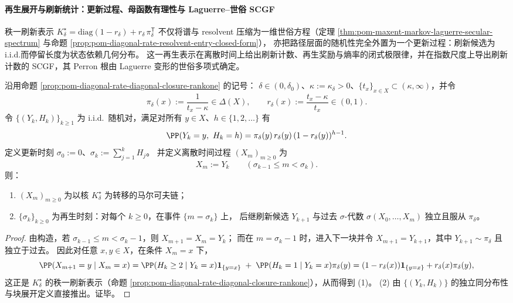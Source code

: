\paragraph{再生展开与刷新统计：更新过程、母函数有理性与 Laguerre--世俗 SCGF}
秩一刷新表示
\(
K^\star_\delta=\mathrm{diag}(1-r_\delta)+r_\delta\,\pi_\delta^{\mathsf T}
\)
不仅将谱与 resolvent 压缩为一维世俗方程（定理 \ref{thm:pom-maxent-markov-laguerre-secular-spectrum} 与命题 \ref{prop:pom-diagonal-rate-resolvent-entry-closed-form}），
亦把路径层面的随机性完全外置为一个更新过程：刷新候选为 i.i.d.\，而停留长度为状态依赖几何分布。
这一再生表示在离散时间上给出刷新计数、再生奖励与熵率的闭式极限律，并在指数尺度上导出刷新计数的 SCGF，其 Perron 根由 Laguerre 变形的世俗多项式确定。

\begin{theorem}[秩一刷新核的再生展开表示]\label{thm:pom-diagonal-rate-refresh-regeneration-iid-expansion}
沿用命题 \ref{prop:pom-diagonal-rate-diagonal-closure-rankone} 的记号：
\(\delta\in(0,\delta_0)\)、\(\kappa:=\kappa_\delta>0\)、\(\{t_x\}_{x\in X}\subset(\kappa,\infty)\)，并令
\[
\pi_\delta(x):=\frac{1}{t_x-\kappa}\in\Delta(X),
\qquad
r_\delta(x):=\frac{t_x-\kappa}{t_x}\in(0,1).
\]
令 \(\{(Y_k,H_k)\}_{k\ge 1}\) 为 i.i.d.\ 随机对，满足对所有 \(y\in X\)、\(h\in\{1,2,\dots\}\) 有
\[
\PP(Y_k=y,\ H_k=h)=\pi_\delta(y)\,r_\delta(y)\,(1-r_\delta(y))^{h-1}.
\]
定义更新时刻 \(\sigma_0:=0\)、\(\sigma_k:=\sum_{j=1}^{k}H_j\)。
并定义离散时间过程 \((X_m)_{m\ge 0}\) 为
\[
X_m:=Y_k\qquad(\sigma_{k-1}\le m<\sigma_k).
\]
则：
\begin{enumerate}
  \item \((X_m)_{m\ge 0}\) 为以核 \(K^\star_\delta\) 为转移的马尔可夫链；
  \item \(\{\sigma_k\}_{k\ge 0}\) 为再生时刻：对每个 \(k\ge 0\)，在事件 \(\{m=\sigma_k\}\) 上，
  后继刷新候选 \(Y_{k+1}\) 与过去 \(\sigma\)-代数 \(\sigma(X_0,\dots,X_m)\) 独立且服从 \(\pi_\delta\)。
\end{enumerate}
\end{theorem}
\begin{proof}
由构造，若 \(\sigma_{k-1}\le m<\sigma_k-1\)，则 \(X_{m+1}=X_m=Y_k\)；
而在 \(m=\sigma_k-1\) 时，进入下一块并令 \(X_{m+1}=Y_{k+1}\)，其中 \(Y_{k+1}\sim\pi_\delta\) 且独立于过去。
因此对任意 \(x,y\in X\)，在条件 \(X_m=x\) 下，
\[
\PP(X_{m+1}=y\mid X_m=x)
=\PP(H_k\ge 2\mid Y_k=x)\mathbf 1_{\{y=x\}}
\;+\;\PP(H_k=1\mid Y_k=x)\pi_\delta(y)
=(1-r_\delta(x))\mathbf 1_{\{y=x\}}+r_\delta(x)\pi_\delta(y),
\]
这正是 \(K^\star_\delta\) 的秩一刷新表示（命题 \ref{prop:pom-diagonal-rate-diagonal-closure-rankone}），从而得到 (1)。
(2) 由 \(\{(Y_k,H_k)\}\) 的独立同分布性与块展开定义直接推出。证毕。
\end{proof}

